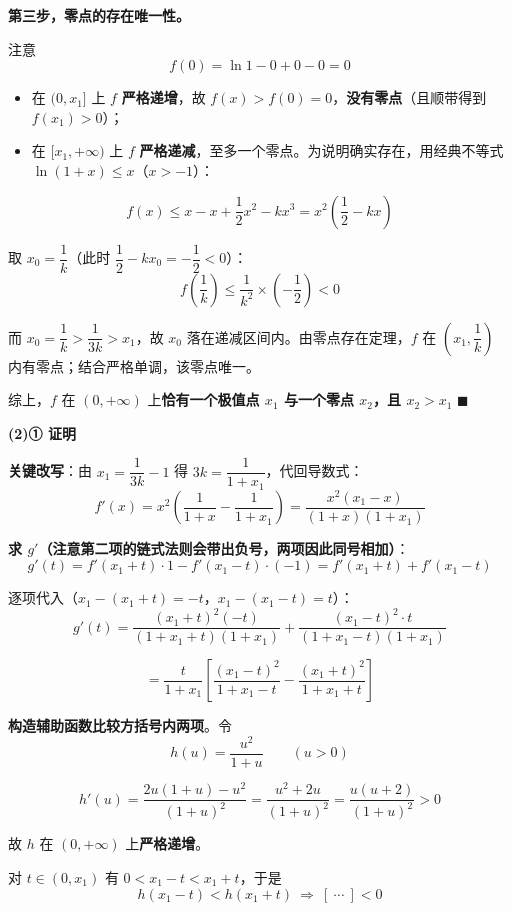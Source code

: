 \textbf{第三步，零点的存在唯一性。}

注意
\[f(0)=\ln1-0+0-0=0\]

\begin{itemize}
\item 在 $(0,x_1]$ 上 $f$ \textbf{严格递增}，故 $f(x)>f(0)=0$，\textbf{没有零点}（且顺带得到 $f(x_1)>0$）；
\item 在 $[x_1,+\infty)$ 上 $f$ \textbf{严格递减}，至多一个零点。为说明确实存在，用经典不等式 $\ln(1+x)\le x$（$x>-1$）：
\end{itemize}
\[f(x)\le x-x+\frac12x^2-kx^3=x^2\left(\frac12-kx\right)\]

取 $x_0=\dfrac1k$（此时 $\dfrac12-kx_0=-\dfrac12<0$）：
\[f\left(\frac1k\right)\le\frac1{k^2}\times\left(-\frac12\right)<0\]

而 $x_0=\dfrac1k>\dfrac1{3k}>x_1$，故 $x_0$ 落在递减区间内。由零点存在定理，$f$ 在 $\left(x_1,\dfrac1k\right)$ 内有零点；结合严格单调，该零点唯一。

综上，$f$ 在 $(0,+\infty)$ 上\textbf{恰有一个极值点 $x_1$ 与一个零点 $x_2$，且 $x_2>x_1$} $\blacksquare$

\par\medskip

\textbf{(2)① 证明}

\textbf{关键改写}：由 $x_1=\dfrac1{3k}-1$ 得 $3k=\dfrac1{1+x_1}$，代回导数式：
\[f'(x)=x^2\left(\frac1{1+x}-\frac1{1+x_1}\right)=\frac{x^2\left(x_1-x\right)}{(1+x)\left(1+x_1\right)}\]

\textbf{求 $g'$（注意第二项的链式法则会带出负号，两项因此同号相加）}：
\[g'(t)=f'\left(x_1+t\right)\cdot 1-f'\left(x_1-t\right)\cdot(-1)=f'\left(x_1+t\right)+f'\left(x_1-t\right)\]

逐项代入（$x_1-\left(x_1+t\right)=-t$，$x_1-\left(x_1-t\right)=t$）：
\[g'(t)=\frac{\left(x_1+t\right)^2(-t)}{\left(1+x_1+t\right)\left(1+x_1\right)}+\frac{\left(x_1-t\right)^2\cdot t}{\left(1+x_1-t\right)\left(1+x_1\right)}\]

\[=\frac{t}{1+x_1}\left[\frac{\left(x_1-t\right)^2}{1+x_1-t}-\frac{\left(x_1+t\right)^2}{1+x_1+t}\right]\]

\textbf{构造辅助函数比较方括号内两项}。令
\[h(u)=\frac{u^2}{1+u}\qquad(u>0)\]

\[h'(u)=\frac{2u(1+u)-u^2}{(1+u)^2}=\frac{u^2+2u}{(1+u)^2}=\frac{u(u+2)}{(1+u)^2}>0\]

故 $h$ 在 $(0,+\infty)$ 上\textbf{严格递增}。

对 $t\in\left(0,x_1\right)$ 有 $0<x_1-t<x_1+t$，于是
\[h\left(x_1-t\right)<h\left(x_1+t\right)\ \Longrightarrow\ \left[\ \cdots\ \right]<0\]

